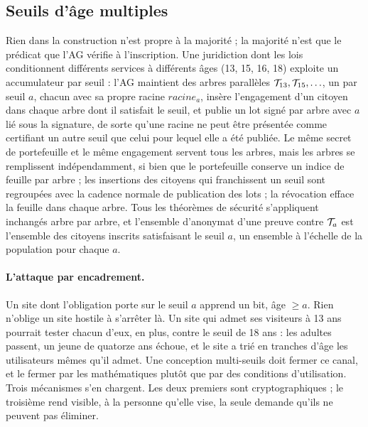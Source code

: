 \documentclass[11pt]{article}
\theoremstyle{definition}
\begin{document}
\subsection{Seuils d'âge multiples}
\label{sec:thresholds}

Rien dans la construction n'est propre à la majorité ; la majorité n'est que le prédicat
que l'AG vérifie à l'inscription. Une juridiction dont les lois conditionnent différents
services à différents âges (13, 15, 16, 18) exploite un accumulateur par seuil : l'AG
maintient des arbres parallèles $\mathcal{T}_{13}, \mathcal{T}_{15}, \ldots$, un par seuil $a$, chacun avec
sa propre racine $\mathit{racine}_a$, insère l'engagement d'un citoyen dans chaque arbre
dont il satisfait le seuil, et publie un lot signé par arbre avec $a$ lié sous la
signature, de sorte qu'une racine ne peut être présentée comme certifiant un autre seuil
que celui pour lequel elle a été publiée. Le même secret de
portefeuille et le même engagement servent tous les arbres, mais les arbres se remplissent
indépendamment, si bien que le portefeuille conserve un indice de feuille par arbre ; les
insertions des citoyens qui
franchissent un seuil sont regroupées avec la cadence normale de publication des lots ; la
révocation efface la feuille dans chaque arbre. Tous les théorèmes de sécurité s'appliquent
inchangés arbre par arbre, et l'ensemble d'anonymat d'une preuve contre $\mathcal{T}_a$ est
l'ensemble des citoyens inscrits satisfaisant le seuil $a$, un ensemble à l'échelle de la
population pour chaque $a$.

\paragraph{L'attaque par encadrement.} Un site dont l'obligation porte sur le seuil $a$
apprend un bit, âge $\ge a$. Rien n'oblige un site hostile à s'arrêter là. Un site qui
admet ses visiteurs à 13 ans pourrait tester chacun d'eux, en plus, contre le seuil de 18
ans : les adultes passent, un jeune de quatorze ans échoue, et le site a trié en tranches
d'âge les utilisateurs mêmes qu'il admet. Une conception multi-seuils doit fermer ce
canal, et le fermer par les mathématiques plutôt que par des conditions d'utilisation.
Trois mécanismes s'en chargent. Les deux premiers sont cryptographiques ; le troisième
rend visible, à la personne qu'elle vise, la seule demande qu'ils ne peuvent pas
éliminer.
\end{document}
